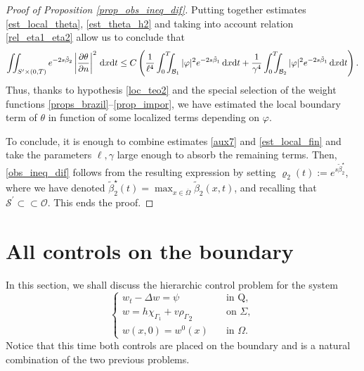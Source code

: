 \documentclass{aims}
\theoremstyle{definition}
\def\cbd{\Gamma}
\def\csbd{\rho_{\Gamma}}
\def\dx{\,\textnormal{d}x}
\def\dt{\textnormal{d}t}
\begin{document}
\begin{proof}[Proof of Proposition \ref{prop_obs_ineq_dif}]
Putting together estimates \eqref{est_local_theta}, \eqref{est_theta_h2} and taking into account relation \eqref{rel_eta1_eta2} allow us to conclude that
%
\begin{equation}\label{est_local_fin}
\iint_{S^{\prime}\times(0,T)}e^{-2s\tilde\beta_2}\left|\frac{\partial \theta}{\partial n}\right|^2\dx\dt  \leq C\left(\frac{1}{\ell^4}\int_0^T\!\!\!\!\int_{\mathcal B_1}|\varphi|^2e^{-2s\tilde{\beta}_1}\dx\dt+\frac{1}{\gamma^4}\int_0^T\!\!\!\!\int_{\mathcal B_2}|\varphi|^2e^{-2s\tilde{\beta}_1}\dx\dt\right).
\end{equation}
%
Thus, thanks to hypothesis \eqref{loc_teo2} and the special selection of the weight functions \eqref{props_brazil}--\eqref{prop_impor}, we have estimated the local boundary term of $\theta$ in function of some localized terms depending on $\varphi$. 

To conclude, it is enough to combine estimates \eqref{aux7} and \eqref{est_local_fin} and take the parameters $\ell,\gamma$ large enough to absorb the remaining terms. Then, \eqref{obs_ineq_dif} follows from the resulting expression by setting $\varrho_2(t):=e^{s\tilde\beta_2^\star}$, where we have denoted $\tilde{\beta}_2^\star(t)=\max_{x\in\overline{\Omega}}\tilde\beta_2(x,t)$, and recalling that $\mathcal S^\prime\subset\subset \mathcal O$.  This ends the proof. 
%
\end{proof}

\section{All controls on the boundary}\label{sec_bound}

In this section, we shall discuss the hierarchic control problem for the system
%
\begin{equation}\label{sys_sec3}
\begin{cases}
w_t-\Delta w=\psi & \quad \text{in Q}, \\
w=h\chi_{\cbd_1}+ v{\csbd}_2&\quad \text{on } \Sigma, \\
w(x,0)=w^0(x) &\quad \text{in } \Omega.
\end{cases}
\end{equation}
%
Notice that this time both controls are placed on the boundary and is a natural combination of the two previous problems. %
\end{document}
